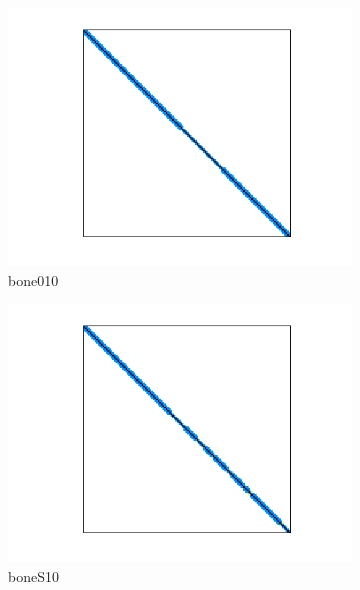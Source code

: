 \begin{figure}[H]
\begin{subfigure}[b]{0.3\textwidth}
        \includegraphics[width=\textwidth]{./images/CG/bone010.png}
        \caption{bone010}
    \end{subfigure}
    \quad 
    \begin{subfigure}[b]{0.3\textwidth}
        \includegraphics[width=\textwidth]{./images/CG/boneS10.png}
        \caption{boneS10}
    \end{subfigure}
    \quad 
    \begin{subfigure}[b]{0.3\textwidth}

\end{subfigure}
\end{figure}

